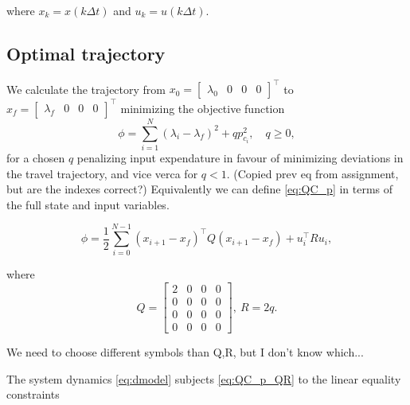 where $x_k = x(k\Delta t)$ and $u_k = u(k\Delta t)$.

\subsection{Optimal trajectory}

We calculate the trajectory from $x_0 = \begin{bmatrix}\lambda_0&0&0&0\end{bmatrix}^\top$ to $x_f = \begin{bmatrix}\lambda_f&0&0&0\end{bmatrix}^\top$ minimizing the objective function 
\begin{equation}
\label{eq:QC_p}
	\phi = \sum_{i=1}^{N}(\lambda_i - \lambda_f)^2 + qp^2_{c_i}, \quad q \ge 0,
\end{equation}
for a chosen $q$ penalizing input expendature in favour of minimizing deviations in the travel trajectory, and vice verca for $q < 1$. (Copied prev eq from assignment, but are the indexes correct?) Equivalently we can define \eqref{eq:QC_p} in terms of the full state and input variables.

\begin{equation}
	\label{eq:QC_p_QR}
	\phi = \frac{1}{2}\sum_{i=0}^{N-1} (x_{i+1}-x_f)^\top Q (x_{i+1}-x_f) + u_i^\top R u_i,
\end{equation}

where
\begin{equation*}
Q = \begin{bmatrix}2&0&0&0\\0&0&0&0\\0&0&0&0\\0&0&0&0\end{bmatrix}, \ R = 2q.
\end{equation*}

We need to choose different symbols than Q,R, but I don't know which...

The system dynamics \eqref{eq:dmodel} subjects \eqref{eq:QC_p_QR} to the linear equality constraints

